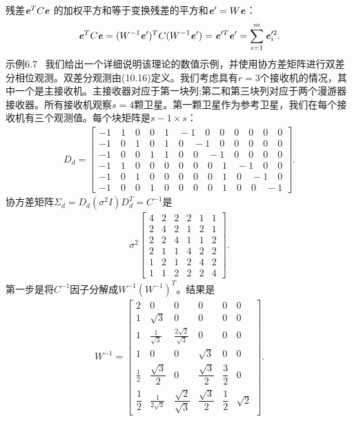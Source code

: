 残差$\textbf{\textit{e}}^{T}C\textbf{\textit{e}}$ 的加权平方和等于变换残差的平方和$\textbf{\textit{e}}'=W\textbf{\textit{e}}$：
\begin{align*}
\textbf{\textit{e}}^{T}C\textbf{\textit{e}} = 
(W^{-1}\textbf{\textit{e}}')^{T}C(W^{-1}\textbf{\textit{e}}')=
\textbf{\textit{e}}'^{T}\textbf{\textit{e}}' =
\sum_{i=1}^m\textbf{\textit{e}}'^{2}_{i}.
\end{align*}
示例6.7 \ 我们给出一个详细说明该理论的数值示例，并使用协方差矩阵进行双差分相位观测。双差分观测由(10.16)定义。我们考虑具有$r = 3$个接收机的情况，其中一个是主接收机。主接收器对应于第一块列;第二和第三块列对应于两个漫游器接收器。所有接收机观察$s = 4$颗卫星。第一颗卫星作为参考卫星，我们在每个接收机有三个观测值。每个块矩阵是$s-1 \times s$：
\begin{align*}
D_{d} =
\begin{bmatrix}
-1 \quad 1 \quad 0 \quad 0 \quad 1 \quad-1 \quad 0 \quad 0 \quad 0 \quad 0 \quad 0 \quad 0 \\
-1 \quad 0 \quad 1 \quad 0 \quad 1 \quad 0 \quad-1 \quad 0 \quad 0 \quad 0 \quad 0 \quad 0 \\
-1 \quad 0 \quad 0 \quad 1 \quad 1 \quad 0 \quad 0 \quad-1 \quad 0 \quad 0 \quad 0 \quad 0 \\
-1 \quad 1 \quad 0 \quad 0 \quad 0 \quad 0 \quad 0 \quad 0 \quad 1 \quad-1 \quad 0 \quad 0 \\
-1 \quad 0 \quad 1 \quad 0 \quad 0 \quad 0 \quad 0 \quad 0 \quad 1 \quad 0 \quad-1 \quad 0 \\
-1 \quad 0 \quad 0 \quad 1 \quad 0 \quad 0 \quad 0 \quad 0 \quad 1 \quad 0 \quad 0 \quad-1 
\end{bmatrix}.
\end{align*}
协方差矩阵$ \Sigma_{d} = D_{d}(\sigma^{2}I)D^{T}_{d} = C^{-1}$是
\begin{align*}
\sigma^{2}
\begin{bmatrix}
4 & 2 & 2 & 2 & 1 & 1 \\
2 & 4 & 2 & 1 & 2 & 1 \\
2 & 2 & 4 & 1 & 1 & 2 \\
2 & 1 & 1 & 4 & 2 & 2 \\
1 & 2 & 1 & 2 & 4 & 2 \\
1 & 1 & 2 & 2 & 2 & 4 
\end{bmatrix}.
\end{align*}
第一步是将$C^{-1}$因子分解成$ W^{-1} (W^{-1} )^{T}$。结果是
\begin{align*}
W^{-1} = 
\begin{bmatrix}
2 & 0 & 0 & 0 & 0 & 0 \\
1 & \sqrt{3} & 0 & 0 & 0 & 0 \\
1 & \frac{1}{\sqrt{3}} & \frac{2\sqrt{2}}{\sqrt{3}} & 0 & 0 & 0 \\
1 & 0 & 0 & \sqrt{3} & 0 & 0 \\
\frac{1}{2} & \dfrac{\sqrt{3}}{2} & 0 & \dfrac{\sqrt{3}}{2} & \dfrac{3}{2} & 0 \\
\dfrac{1}{2} & \frac{1}{2\sqrt{3}} & \dfrac{\sqrt{2}}{\sqrt{3}} & \dfrac{\sqrt{3}}{2} & \dfrac{1}{2} & \sqrt{2} 
\end{bmatrix}.
\end{align*}
